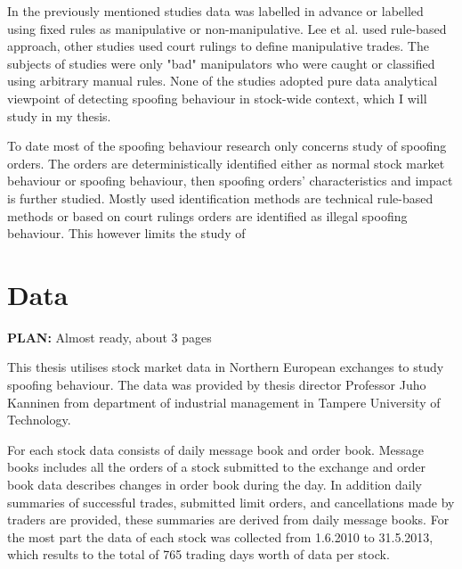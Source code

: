 \documentclass{tut-thesis}
\begin{document}
In the previously mentioned studies data was labelled in advance or labelled using fixed rules as manipulative or non-manipulative. Lee et al. used rule-based approach, other studies used court rulings to define manipulative trades. The subjects of studies were only "bad" manipulators who were caught or classified using arbitrary manual rules. None of the studies adopted pure data analytical viewpoint of detecting spoofing behaviour in stock-wide context, which I will study in my thesis.

To date most of the spoofing behaviour research only concerns study of spoofing orders. The orders are deterministically identified either as normal stock market behaviour or spoofing behaviour, then spoofing orders' characteristics and impact is further studied. Mostly used identification methods are technical rule-based methods or based on court rulings orders are identified as illegal spoofing behaviour. This however limits the study of  

\section{Data}
\textbf{PLAN:} Almost ready, about 3 pages

This thesis utilises stock market data in Northern European exchanges to study spoofing behaviour. The data was provided by thesis director Professor Juho Kanninen from department of industrial management in Tampere University of Technology. 

For each stock data consists of daily message book and order book. Message books includes all the orders of a stock submitted to the exchange and order book data describes changes in order book during the day. In addition daily summaries of successful trades, submitted limit orders, and cancellations made by traders are provided, these summaries are derived from daily message books. For the most part the data of each stock was collected from 1.6.2010 to 31.5.2013, which results to the total of 765 trading days worth of data per stock. 

\end{document}

